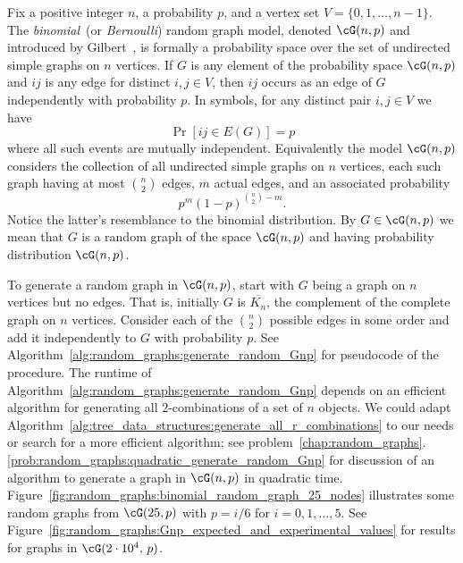 Fix a positive integer $n$, a probability $p$, and a vertex set
$V = \{0, 1, \dots, n - 1\}$. The
\emph{binomial}~(or
\emph{Bernoulli}) random graph model,
denoted $\cG(n,p)$ and introduced by Gilbert~\cite{Gilbert1959}, is
formally a probability space over the set of
undirected simple graphs on $n$ vertices. If $G$ is any element of the
probability space $\cG(n,p)$ and $ij$ is any edge for distinct
$i,j \in V$, then $ij$ occurs as an edge of $G$ independently with
probability $p$. In symbols, for any distinct pair $i,j \in V$ we have
\[
\Pr[ij \in E(G)]
=
p
\]
where all such events are mutually independent. Equivalently the model
$\cG(n,p)$ considers the collection of all undirected simple graphs on
$n$ vertices, each such graph having at most $\binom{n}{2}$ edges, $m$
actual edges, and an associated probability
\begin{equation}
\label{eqn:random_graphs:probability_of_chosen_graph_binomial_model}
p^m (1 - p)^{\binom{n}{2} - m}.
\end{equation}
Notice the latter's resemblance to the
binomial distribution. By
$G \in \cG(n,p)$ we mean that $G$ is a random graph of the space
$\cG(n,p)$ and having probability
distribution $\cG(n,p)$.

To generate a random graph in $\cG(n,p)$, start with $G$ being a graph
on $n$ vertices but no edges. That is, initially $G$ is
$\overline{K_n}$, the complement of the complete
graph on $n$ vertices. Consider each of the $\binom{n}{2}$ possible
edges in some order and add it independently to $G$ with probability
$p$. See Algorithm~\ref{alg:random_graphs:generate_random_Gnp} for
pseudocode of the procedure. The runtime of
Algorithm~\ref{alg:random_graphs:generate_random_Gnp} depends on an
efficient algorithm for generating all $2$-combinations of a set of
$n$ objects. We could adapt
Algorithm~\ref{alg:tree_data_structures:generate_all_r_combinations}
to our needs or search for a more efficient algorithm; see
problem~\ref{chap:random_graphs}.\ref{prob:random_graphs:quadratic_generate_random_Gnp}
for discussion of an algorithm to generate a graph in $\cG(n,p)$ in
quadratic
time. Figure~\ref{fig:random_graphs:binomial_random_graph_25_nodes}
illustrates some random graphs from $\cG(25,p)$ with $p = i/6$ for
$i = 0, 1, \dots, 5$. See
Figure~\ref{fig:random_graphs:Gnp_expected_and_experimental_values}
for results for graphs in $\cG(2 \cdot 10^4,\, p)$.

